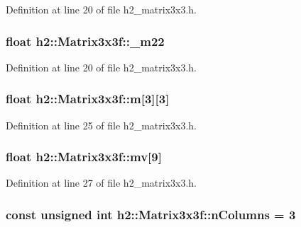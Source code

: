 Definition at line 20 of file h2\-\_\-matrix3x3.\-h.

\hypertarget{classh2_1_1_matrix3x3f_a84ca111bbdcd71e7614bf0b9dfabccb8}{
\subsubsection[{\-\_\-m22}]{\setlength{\rightskip}{0pt plus 5cm}float h2\-::\-Matrix3x3f\-::\-\_\-m22}}\label{classh2_1_1_matrix3x3f_a84ca111bbdcd71e7614bf0b9dfabccb8}


Definition at line 20 of file h2\-\_\-matrix3x3.\-h.

\hypertarget{classh2_1_1_matrix3x3f_a03a7fb8053dc3438756873d6474e96f5}{
\subsubsection[{m}]{\setlength{\rightskip}{0pt plus 5cm}float h2\-::\-Matrix3x3f\-::m\mbox{[}3\mbox{]}\mbox{[}3\mbox{]}}}\label{classh2_1_1_matrix3x3f_a03a7fb8053dc3438756873d6474e96f5}


Definition at line 25 of file h2\-\_\-matrix3x3.\-h.

\hypertarget{classh2_1_1_matrix3x3f_acf196f033d8e70e39912a2069f93aef1}{
\subsubsection[{mv}]{\setlength{\rightskip}{0pt plus 5cm}float h2\-::\-Matrix3x3f\-::mv\mbox{[}9\mbox{]}}}\label{classh2_1_1_matrix3x3f_acf196f033d8e70e39912a2069f93aef1}


Definition at line 27 of file h2\-\_\-matrix3x3.\-h.

\hypertarget{classh2_1_1_matrix3x3f_afe657d9a533821132d4a87705ac13c58}{
\subsubsection[{n\-Columns}]{\setlength{\rightskip}{0pt plus 5cm}const unsigned int h2\-::\-Matrix3x3f\-::n\-Columns = 3\hspace{0.3cm}{\ttfamily [static]}}}\label{classh2_1_1_matrix3x3f_afe657d9a533821132d4a87705ac13c58}


